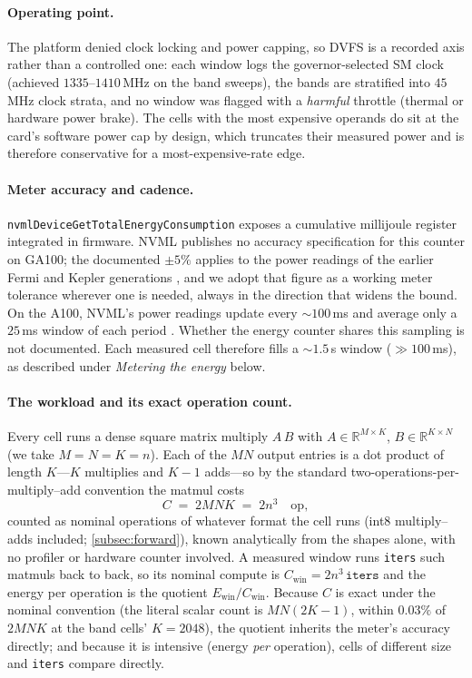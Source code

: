 \documentclass{article}
\theoremstyle{plain}
\theoremstyle{definition}
\theoremstyle{remark}
\begin{document}
\paragraph{Operating point.}
The platform denied clock locking and power capping, so DVFS is a recorded
axis rather than a controlled one: each window logs the governor-selected
SM clock (achieved $1335$--$1410$\,MHz on the band sweeps), the bands are
stratified into $45$\,MHz clock strata, and no window was flagged with a
\emph{harmful} throttle (thermal or hardware power brake). The cells with
the most expensive operands do sit at the card's software power cap by design, which
truncates their measured power and is therefore conservative for a
most-expensive-rate edge.

\paragraph{Meter accuracy and cadence.}
\texttt{nvmlDeviceGetTotalEnergyConsumption} exposes a cumulative
millijoule register integrated in firmware. NVML publishes no accuracy
specification for this counter on GA100; the documented $\pm 5\%$ applies
to the power readings of the earlier Fermi and Kepler generations
\citep{nvidia_nvml}, and we
adopt that figure as a working meter tolerance wherever one is needed,
always in the direction that widens the bound. On the A100, NVML's power
readings update every ${\sim}100$\,ms and average only a $25$\,ms window
of each period \citep{yang2023parttime}. Whether the energy counter shares
this sampling is not documented. Each measured cell therefore
fills a ${\sim}1.5$\,s window (${\gg}100$\,ms), as described under
\emph{Metering the energy} below.

\paragraph{The workload and its exact operation count.}
Every cell runs a dense square matrix multiply $A\,B$ with
$A\in\mathbb{R}^{M\times K}$, $B\in\mathbb{R}^{K\times N}$ (we take
$M=N=K=n$). Each of the $MN$ output entries is a dot product of length
$K$---$K$ multiplies and $K{-}1$ adds---so by the standard
two-operations-per-multiply--add convention the matmul costs
\begin{equation}
	C \;=\; 2MNK \;=\; 2n^3 \quad \text{op},
	\label{eq:flopcount}
\end{equation}
counted as nominal operations of whatever format the cell runs (int8
multiply--adds included; \cref{subsec:forward}),
known analytically from the shapes alone, with no profiler or
hardware counter involved. A measured window runs \texttt{iters} such
matmuls back to back, so its nominal compute is
$C_{\mathrm{win}} = 2n^3\,\texttt{iters}$ and the energy per operation is
the quotient $E_{\mathrm{win}} / C_{\mathrm{win}}$. Because $C$ is exact under the
nominal convention (the literal scalar count is $MN(2K-1)$, within
$0.03\%$ of $2MNK$ at the band cells' $K = 2048$), the quotient
inherits the meter's accuracy directly; and because it is intensive
(energy \emph{per} operation), cells of different size and \texttt{iters}
compare directly.
\end{document}
